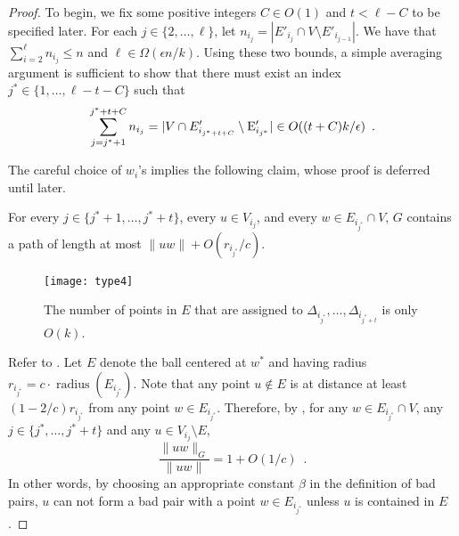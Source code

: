 \documentclass{patmorin}
\DeclareMathOperator{\radius}{radius}
\begin{document}
\begin{proof}
  To begin, we fix some positive integers $C\in O(1)$ and $t< \ell
  - C$ to be specified later.  For each $j\in\{2,\ldots,\ell\}$,
  let $n_{i_j}=|E'_{i_j}\cap V\setminus E'_{i_{j-1}}|$. We have that
  $\sum_{i=2}^{\ell} n_{i_j} \le n$ and $\ell \in\Omega(\epsilon n/k)$.
  Using these two bounds, a simple averaging argument is sufficient
  to show that there must exist an index $j^*\in\{1,\ldots,\ell-t-C\}$
  such that
  \begin{equation}
     \sum_{j=j^*+1}^{j^*+t+C} n_{i_j}
        = |V\cap E'_{i_{j^*+t+C}}\setminus \E'_{i_{j^*}}| 
          \in O((t+C)k/\epsilon) \enspace . \eqlabel{sparse}
  \end{equation}

  The careful choice of $w_i$'s implies the following claim, whose proof
  is deferred until later.
  \begin{clm}
    For every $j\in\{j^*+1,\ldots,j^*+t\}$, every $u\in V_{i_j}$, and
    every $w\in E_{i_{j^*}}\cap V$, $G$ contains a path of length at most
    $\|uw\|+O(r_{i_{j^*}}/c)$.
  \end{clm}

  
  \begin{figure}
    \begin{center}
      \texttt{[image: type4]}
    \end{center}
    \caption{The number of points in $E$ that are assigned to
      $\Delta_{i_{j^*}},\ldots,\Delta_{i_{j^*+t}}$
      is only $O(k)$.}
  \end{figure}

  Refer to .  Let $E$ denote the ball centered at $w^*$
  and having radius $r_{i_{j^*}}=c\cdot\radius(E_{i_{j^*}})$.  Note that
  any point $u\not\in E$ is at distance at least $(1-2/c)r_{i_{j^*}}$ from
  any point $w\in E_{i_{j^*}}$.  Therefore, by , for any
  $w\in E_{i_{j^*}}\cap V$, any $j\in\{j^*,\ldots,j^*+t\}$ and any $u\in
  V_{i_{j}}\setminus E$,
  \[  
     \frac{\|uw\|_G}{\|uw\|} = 1+O(1/c) \enspace . 
  \]
  In other words, by choosing an appropriate constant $\beta$ in the
  definition of bad pairs, $u$ can not form a bad pair with a point
  $w\in E_{i_{j^*}}$ unless $u$ is contained in $E$.



\end{proof}
\end{document}
